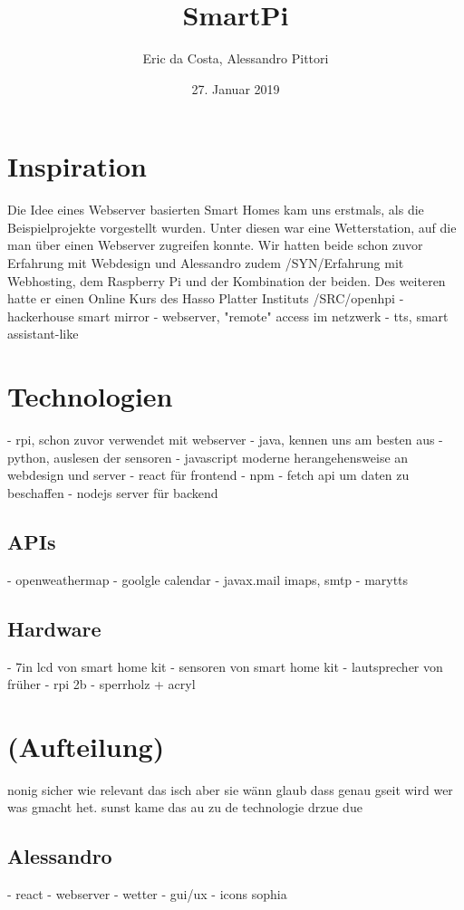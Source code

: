\documentclass[11pt,a4paper]{article}
\title{SmartPi}
\author{Eric da Costa, Alessandro Pittori}
\date{27. Januar 2019}
\begin{document}
\maketitle

\tableofcontents
\section{Inspiration}
Die Idee eines Webserver basierten Smart Homes kam uns erstmals, als die Beispielprojekte vorgestellt wurden. Unter diesen war eine Wetterstation, auf die man über einen Webserver zugreifen konnte. Wir hatten beide schon zuvor Erfahrung mit Webdesign und Alessandro zudem /SYN/Erfahrung mit Webhosting, dem Raspberry Pi und der Kombination der beiden. Des weiteren hatte er einen Online Kurs des Hasso Platter Instituts /SRC/openhpi
\cite{smartmirror}
- hackerhouse smart mirror
- webserver, "remote" access im netzwerk
- tts, smart assistant-like

\section{Technologien}
- rpi, schon zuvor verwendet mit webserver
- java, kennen uns am besten aus
- python, auslesen der sensoren
- javascript
	moderne herangehensweise an webdesign und server
	- react für frontend
		- npm
		- fetch api um daten zu beschaffen
	- nodejs server für backend
\subsection{APIs}
- openweathermap
- goolgle calendar
- javax.mail imaps, smtp
- marytts
\subsection{Hardware}
- 7in lcd von smart home kit
- sensoren von smart home kit
- lautsprecher von früher
- rpi 2b
- sperrholz + acryl

\section{(Aufteilung)}
nonig sicher wie relevant das isch aber sie wänn glaub dass genau gseit wird wer was gmacht het. sunst kame das au zu de technologie drzue due
\subsection{Alessandro}
- react
- webserver
- wetter
- gui/ux
- icons sophia
\end{document}
